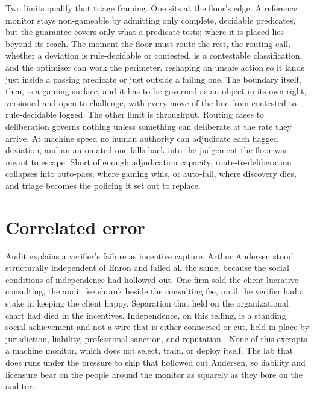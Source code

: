 \documentclass[11pt]{article}
\begin{document}
Two limits qualify that triage framing. One sits at the floor's edge. A reference monitor stays non-gameable by admitting only complete, decidable predicates, but the guarantee covers only what a predicate tests; where it is placed lies beyond its reach. The moment the floor must route the rest, the routing call, whether a deviation is rule-decidable or contested, is a contestable classification, and the optimizer can work the perimeter, reshaping an unsafe action so it lands just inside a passing predicate or just outside a failing one. The boundary itself, then, is a gaming surface, and it has to be governed as an object in its own right, versioned and open to challenge, with every move of the line from contested to rule-decidable logged. The other limit is throughput. Routing cases to deliberation governs nothing unless something can deliberate at the rate they arrive. At machine speed no human authority can adjudicate each flagged deviation, and an automated one falls back into the judgement the floor was meant to escape. Short of enough adjudication capacity, route-to-deliberation collapses into auto-pass, where gaming wins, or auto-fail, where discovery dies, and triage becomes the policing it set out to replace.

\section{Correlated error}

Audit explains a verifier's failure as incentive capture. Arthur Andersen stood structurally independent of Enron and failed all the same, because the social conditions of independence had hollowed out. One firm sold the client lucrative consulting, the audit fee shrank beside the consulting fee, until the verifier had a stake in keeping the client happy. Separation that held on the organizational chart had died in the incentives. Independence, on this telling, is a standing social achievement and not a wire that is either connected or cut, held in place by jurisdiction, liability, professional sanction, and reputation \citep{abbott1988,power1997}. None of this exempts a machine monitor, which does not select, train, or deploy itself. The lab that does runs under the pressure to ship that hollowed out Andersen, so liability and licensure bear on the people around the monitor as squarely as they bore on the auditor.
\end{document}
